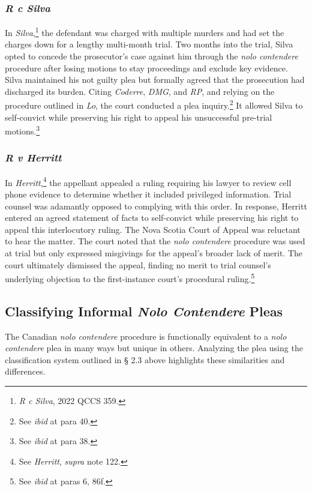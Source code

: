 \subsubsection{\textit{R c Silva}}

In \textit{Silva},\footnote{\textit{R c Silva}, 2022 QCCS 359.} the defendant was charged with multiple murders and had set the charges down for a lengthy multi-month trial. Two months into the trial, Silva opted to concede the prosecutor's case against him through the \textit{nolo contendere} procedure after losing motions to stay proceedings and exclude key evidence. Silva maintained his not guilty plea but formally agreed that the prosecution had discharged its burden. Citing \textit{Coderre}, \textit{DMG}, and \textit{RP}, and relying on the procedure outlined in \textit{Lo}, the court conducted a plea inquiry.\footnote{See \textit{ibid} at para 40.} It allowed Silva to self-convict while preserving his right to appeal his unsuccessful pre-trial motions.\footnote{See \textit{ibid} at para 38.}

\subsubsection{\textit{R v Herritt}}

In \textit{Herritt},\footnote{See \textit{Herritt}, \textit{supra} note 122.} the appellant appealed a ruling requiring his lawyer to review cell phone evidence to determine whether it included privileged information. Trial counsel was adamantly opposed to complying with this order. In response, Herritt entered an agreed statement of facts to self-convict while preserving his right to appeal this interlocutory ruling. The Nova Scotia Court of Appeal was reluctant to hear the matter. The court noted that the \textit{nolo contendere} procedure was used at trial but only expressed misgivings for the appeal's broader lack of merit. The court ultimately dismissed the appeal, finding no merit to trial counsel's underlying objection to the first-instance court's procedural ruling.\footnote{See \textit{ibid} at paras 6, 86f.}

\subsection{Classifying Informal \textit{Nolo Contendere} Pleas}

The Canadian \textit{nolo contendere} procedure is functionally equivalent to a \textit{nolo contendere} plea in many ways but unique in others. Analyzing the plea using the classification system outlined in § 2.3 above highlights these similarities and differences.


